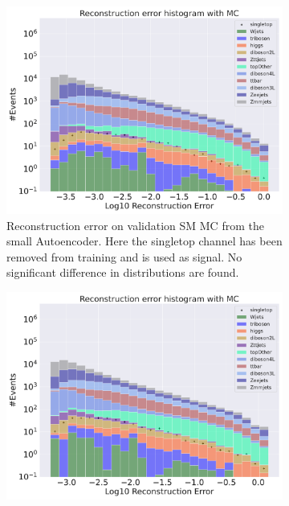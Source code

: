 \begin{figure}[h!]
    \centering
    \begin{subfigure}{.45\textwidth}
        \includegraphics[width=\textwidth]{Figures/AE_testing/small/b_data_recon_big_rm3_feats_sig_singletop.pdf}
        \caption{Reconstruction error on validation SM MC from the small Autoencoder. Here the singletop channel has been removed from training and 
        is used as signal. No significant difference in distributions are found. }
        \label{fig:ae_small_singletop}
    \end{subfigure}
    \hfill
    \begin{subfigure}{.45\textwidth}
        \includegraphics[width=\textwidth]{Figures/AE_testing/big/b_data_recon_big_rm3_feats_sig_singletop.pdf}

\end{subfigure}
\end{figure}

